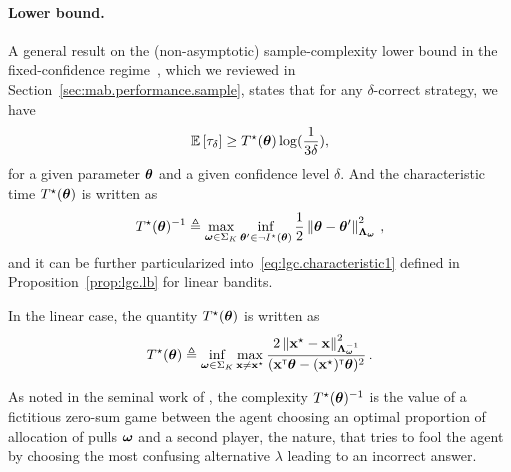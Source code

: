 \paragraph{Lower bound.} 
A general result on the (non-asymptotic) sample-complexity lower bound in the fixed-confidence regime~\citep{garivier2016tracknstop}, which we reviewed in Section~\ref{sec:mab.performance.sample}, states that for any $\delta$-correct strategy, we have
\[
    \mathbb{E}\left[\tau_\delta\right] \geq T^\star({\boldsymbol \theta})\log(\frac{1}{3\delta}),
\]
for a given parameter ${\boldsymbol \theta}$ and a given confidence level $\delta$. And the characteristic time $T^\star({\boldsymbol \theta})$ is written as
\begin{align}\label{eq:lgc.characteristic2}
    T^{\star}({\boldsymbol \theta})^{-1} \triangleq \max_{{\boldsymbol \omega} \in \Sigma_K} \inf_{{\boldsymbol \theta}'\in \neg I^\star({\boldsymbol \theta})} \frac{1}{2}\left\lVert{\boldsymbol \theta} - {\boldsymbol \theta}'\right\rVert_{{\boldsymbol \Lambda}_{{\boldsymbol \omega}}}^2\,,
\end{align}
and it can be further particularized into~\eqref{eq:lgc.characteristic1} defined in Proposition~\ref{prop:lgc.lb} for linear bandits.

\begin{proposition}\label{prop:lgc.lb}
\begin{leftbar}[propositionbar]
In the linear case, the quantity $T^\star({\boldsymbol \theta})$ is written as
\begin{align}\label{eq:lgc.characteristic1}
    T^\star({\boldsymbol \theta}) \triangleq \inf_{{\boldsymbol \omega}\in\Sigma_K}\max_{{\bf x}\neq {\bf x}^\star} \frac{2\left\lVert{\bf x}^\star - {\bf x}\right\rVert^2_{{\boldsymbol \Lambda}_{{\boldsymbol \omega}}^{-1}}}{({\bf x}^\mathsf{\scriptscriptstyle T}{\boldsymbol \theta}-({\bf x}^\star)^\mathsf{\scriptscriptstyle T}{\boldsymbol \theta})^2}\,.
\end{align}
\end{leftbar}
\end{proposition}

\begin{remark}
\begin{leftbar}[remarkbar]
    As noted in the seminal work of \citet{chernoff1959}, the complexity $T^{\star}({\boldsymbol \theta})^{-1}$ is the value of a fictitious zero-sum game between the agent choosing an optimal proportion of allocation of pulls ${\boldsymbol \omega}$ and a second player, the nature, that tries to fool the agent by choosing the most confusing alternative $\lambda$ leading to an incorrect answer.
\end{leftbar}
\end{remark}


